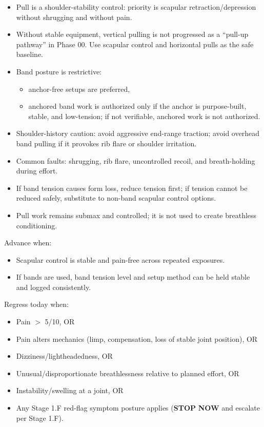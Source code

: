 \documentclass[10pt]{article}
\begin{document}
\begin{itemize}
\item Pull is a shoulder-stability control: priority is scapular retraction/depression without shrugging and without pain.
\item Without stable equipment, vertical pulling is not progressed as a “pull-up pathway” in Phase 00. Use scapular control and horizontal pulls as the safe baseline.
\item Band posture is restrictive:
  \begin{itemize}
  \item anchor-free setups are preferred,
  \item anchored band work is authorized only if the anchor is purpose-built, stable, and low-tension; if not verifiable, anchored work is not authorized.
  \end{itemize}
\item Shoulder-history caution: avoid aggressive end-range traction; avoid overhead band pulling if it provokes rib flare or shoulder irritation.
\item Common faults: shrugging, rib flare, uncontrolled recoil, and breath-holding during effort.
\item If band tension causes form loss, reduce tension first; if tension cannot be reduced safely, substitute to non-band scapular control options.
\item Pull work remains submax and controlled; it is not used to create breathless conditioning.
\end{itemize}

Advance when:

\begin{itemize}
\item Scapular control is stable and pain-free across repeated exposures.
\item If bands are used, band tension level and setup method can be held stable and logged consistently.
\end{itemize}

Regress today when:

\begin{itemize}
\item Pain $>$ 5/10, OR
\item Pain alters mechanics (limp, compensation, loss of stable joint position), OR
\item Dizziness/lightheadedness, OR
\item Unusual/disproportionate breathlessness relative to planned effort, OR
\item Instability/swelling at a joint, OR
\item Any Stage 1.F red-flag symptom posture applies (\textbf{STOP} \textbf{NOW} and escalate per Stage 1.F).
\end{itemize}
\end{document}

